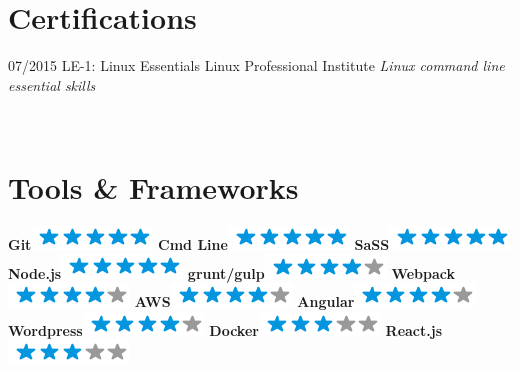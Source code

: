 \documentclass[]{friggeri-cv}
\begin{document}
\section{Certifications}
\begin{entrylist}
  \entry
    {07/2015}
    {LE-1: Linux Essentials}
    {Linux Professional Institute}
    {\emph{Linux command line essential skills}}
\end{entrylist}

\newpage

\begin{aside}
~
~
~
  \section{Tools \& Frameworks}
    \textbf{Git}\includegraphics[scale=0.40]{img/5stars.png}
    \textbf{Cmd Line}\includegraphics[scale=0.40]{img/5stars.png}
    \textbf{SaSS}\includegraphics[scale=0.40]{img/5stars.png}
    \textbf{Node.js}\includegraphics[scale=0.40]{img/5stars.png}
     \textbf{grunt/gulp}\includegraphics[scale=0.40]{img/4stars.png}
     \textbf{Webpack}\includegraphics[scale=0.40]{img/4stars.png}
     \textbf{AWS}\includegraphics[scale=0.40]{img/4stars.png}
     \textbf{Angular}\includegraphics[scale=0.40]{img/4stars.png}
     \textbf{Wordpress}\includegraphics[scale=0.40]{img/4stars.png}
      \textbf{Docker}\includegraphics[scale=0.40]{img/3stars.png}
     \textbf{React.js}\includegraphics[scale=0.40]{img/3stars.png}
     

\end{aside}
\end{document}
